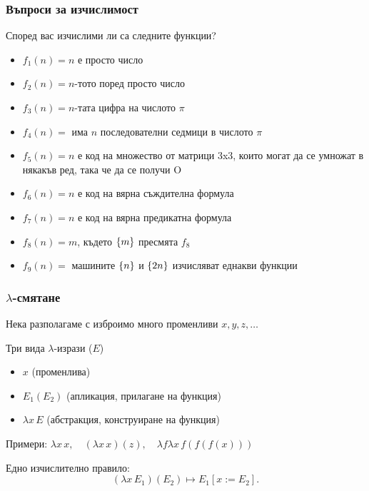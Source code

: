 \documentclass{beamer}
\begin{document}
\begin{frame}
  \frametitle{Въпроси за изчислимост}

  Според вас изчислими ли са следните функции?
  \begin{itemize}[<+->]
  \item $f_1(n) = n$ е просто число
  \item $f_2(n) = n$-тото поред просто число
  \item $f_3(n) = n$-тата цифра на числото $\pi$
  \item $f_4(n) = $ има $n$ последователни седмици в числото $\pi$
  \item $f_5(n) = n$ е код на множество от матрици 3x3, които могат да се умножат в някакъв ред, така че да се получи O
  \item $f_6(n) = n$ е код на вярна съждителна формула
  \item $f_7(n) = n$ е код на вярна предикатна формула
  \item $f_8(n) = m$, където $\{m\}$ пресмята $f_8$ 
  \item $f_9(n) = $ машините $\{n\}$ и $\{2n\}$ изчисляват еднакви функции
  \end{itemize}
\end{frame}

\begin{frame}
  \frametitle{$\lambda$-смятане}

  Нека разполагаме с изброимо много променливи $x,y,z,\ldots$
  \vspace{1em}

  Три вида $\lambda$-изрази ($E$)
  \begin{itemize}
  \item $x$ (променлива)
  \item $E_1(E_2)$ (апликация, прилагане на функция)
  \item $\lambda x \, E$ (абстракция, конструиране на функция)
  \end{itemize}
  \vspace{1em}

  \pause

  Примери: $\lambda x\, x, \quad (\lambda x\, x)(z), \quad \lambda f\lambda x\, f(f(f(x)))$
  \vspace{1em}

  \pause

  Едно изчислително правило:
  \begin{equation*}
    (\lambda x\,E_1)(E_2) \mapsto E_1[x := E_2].
  \end{equation*}
\end{frame}
\end{document}
